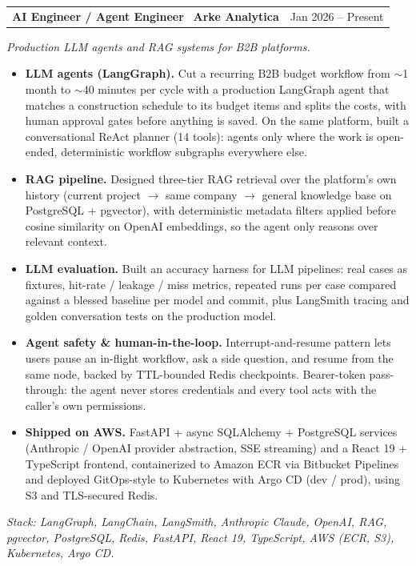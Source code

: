 \documentclass[10pt,a4paper]{article}
\makeatletter
\newcommand{\job}[3]{%
  \par\vspace{4pt}%
  \noindent\begin{tabularx}{\linewidth}{@{}X r@{}}%
    \textbf{#1} \, {\color{accent}\textbf{#2}} & {\small\color{muted}#3} \\
  \end{tabularx}%
  \vspace{1pt}%
}
\makeatother
\begin{document}
\job{AI Engineer / Agent Engineer}{Arke Analytica}{Jan 2026 -- Present}
\textit{\small Production LLM agents and RAG systems for B2B platforms.}
\begin{itemize}
  \item \textbf{LLM agents (LangGraph).} Cut a recurring B2B budget workflow from $\sim$1 month to $\sim$40 minutes per cycle with a production LangGraph agent that matches a construction schedule to its budget items and splits the costs, with human approval gates before anything is saved. On the same platform, built a conversational ReAct planner (14 tools): agents only where the work is open-ended, deterministic workflow subgraphs everywhere else.
  \item \textbf{RAG pipeline.} Designed three-tier RAG retrieval over the platform's own history (current project $\rightarrow$ same company $\rightarrow$ general knowledge base on PostgreSQL + pgvector), with deterministic metadata filters applied before cosine similarity on OpenAI embeddings, so the agent only reasons over relevant context.
  \item \textbf{LLM evaluation.} Built an accuracy harness for LLM pipelines: real cases as fixtures, hit-rate / leakage / miss metrics, repeated runs per case compared against a blessed baseline per model and commit, plus LangSmith tracing and golden conversation tests on the production model.
  \item \textbf{Agent safety \& human-in-the-loop.} Interrupt-and-resume pattern lets users pause an in-flight workflow, ask a side question, and resume from the same node, backed by TTL-bounded Redis checkpoints. Bearer-token pass-through: the agent never stores credentials and every tool acts with the caller's own permissions.
  \item \textbf{Shipped on AWS.} FastAPI + async SQLAlchemy + PostgreSQL services (Anthropic / OpenAI provider abstraction, SSE streaming) and a React 19 + TypeScript frontend, containerized to Amazon ECR via Bitbucket Pipelines and deployed GitOps-style to Kubernetes with Argo CD (dev / prod), using S3 and TLS-secured Redis.
\end{itemize}
\textit{\small Stack: LangGraph, LangChain, LangSmith, Anthropic Claude, OpenAI, RAG, pgvector, PostgreSQL, Redis, FastAPI, React 19, TypeScript, AWS (ECR, S3), Kubernetes, Argo CD.}
\end{document}
